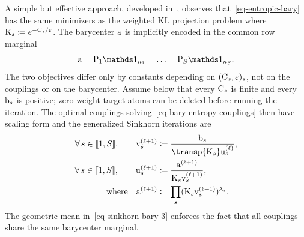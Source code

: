 A simple but effective approach, developed in~\cite{2015-benamou-cisc}, observes that~\eqref{eq-entropic-bary} has the same minimizers as the weighted KL projection problem
where $\mathrm{K}_s\coloneqq e^{-\mathrm{C}_s/\varepsilon}$. The barycenter $\mathrm{a}$ is implicitly encoded in the common row marginal
\[
	\a=\P_1\ones_{n_1}=\ldots=\P_S\ones_{n_S}.
\]
The two objectives differ only by constants depending on $(\mathrm{C}_s,\varepsilon)_s$, not on the couplings or on the barycenter. Assume below that every $\mathrm{C}_s$ is finite and every $\mathrm{b}_s$ is positive; zero-weight target atoms can be deleted before running the iteration. The optimal couplings solving~\eqref{eq-bary-entropy-couplings} then have scaling form
and the generalized Sinkhorn iterations are
\begin{align}
	\foralls s\in\range{1,S},\qquad
	\itt{\vD}_s
	&\eqdef
	\frac{\b_s}{\transp{\K_s}\it{\uD}_s},
	\label{eq-sinkhorn-bary}
	\\
	\foralls s\in\range{1,S},\qquad
	\itt{\uD}_s
	&\eqdef
	\frac{\itt{\a}}{\K_s\itt{\vD}_s},
	\label{eq-sinkhorn-bary-2}
	\\
	\qwhereq
	\itt{\a}
	&\eqdef
	\prod_s(\K_s\itt{\vD}_s)^{\la_s}.
	\label{eq-sinkhorn-bary-3}
\end{align}
The geometric mean in~\eqref{eq-sinkhorn-bary-3} enforces the fact that all couplings share the same barycenter marginal.

